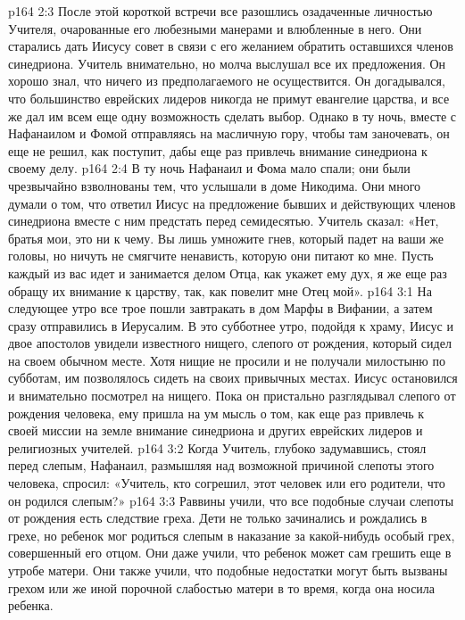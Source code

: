 \vs p164 2:3 После этой короткой встречи все разошлись озадаченные личностью Учителя, очарованные его любезными манерами и влюбленные в него. Они старались дать Иисусу совет в связи с его желанием обратить оставшихся членов синедриона. Учитель внимательно, но молча выслушал все их предложения. Он хорошо знал, что ничего из предполагаемого не осуществится. Он догадывался, что большинство еврейских лидеров никогда не примут евангелие царства, и все же дал им всем еще одну возможность сделать выбор. Однако в ту ночь, вместе с Нафанаилом и Фомой отправляясь на масличную гору, чтобы там заночевать, он еще не решил, как поступит, дабы еще раз привлечь внимание синедриона к своему делу.
\vs p164 2:4 В ту ночь Нафанаил и Фома мало спали; они были чрезвычайно взволнованы тем, что услышали в доме Никодима. Они много думали о том, что ответил Иисус на предложение бывших и действующих членов синедриона вместе с ним предстать перед семидесятью. Учитель сказал: «Нет, братья мои, это ни к чему. Вы лишь умножите гнев, который падет на ваши же головы, но ничуть не смягчите ненависть, которую они питают ко мне. Пусть каждый из вас идет и занимается делом Отца, как укажет ему дух, я же еще раз обращу их внимание к царству, так, как повелит мне Отец мой».
\vs p164 3:1 На следующее утро все трое пошли завтракать в дом Марфы в Вифании, а затем сразу отправились в Иерусалим. В это субботнее утро, подойдя к храму, Иисус и двое апостолов увидели известного нищего, слепого от рождения, который сидел на своем обычном месте. Хотя нищие не просили и не получали милостыню по субботам, им позволялось сидеть на своих привычных местах. Иисус остановился и внимательно посмотрел на нищего. Пока он пристально разглядывал слепого от рождения человека, ему пришла на ум мысль о том, как еще раз привлечь к своей миссии на земле внимание синедриона и других еврейских лидеров и религиозных учителей.
\vs p164 3:2 Когда Учитель, глубоко задумавшись, стоял перед слепым, Нафанаил, размышляя над возможной причиной слепоты этого человека, спросил: «Учитель, кто согрешил, этот человек или его родители, что он родился слепым?»
\vs p164 3:3 \pc Раввины учили, что все подобные случаи слепоты от рождения есть следствие греха. Дети не только зачинались и рождались в грехе, но ребенок мог родиться слепым в наказание за какой\hyp{}нибудь особый грех, совершенный его отцом. Они даже учили, что ребенок может сам грешить еще в утробе матери. Они также учили, что подобные недостатки могут быть вызваны грехом или же иной порочной слабостью матери в то время, когда она носила ребенка.
